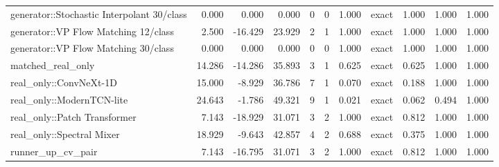 \begin{table}[t]
\begin{tabular}{lrrrrrrrrrr}
generator::Stochastic Interpolant 30/class & 0.000 & 0.000 & 0.000 & 0 & 0 & 1.000 & exact & 1.000 & 1.000 & 1.000 \\
generator::VP Flow Matching 12/class & 2.500 & -16.429 & 23.929 & 2 & 1 & 1.000 & exact & 1.000 & 1.000 & 1.000 \\
generator::VP Flow Matching 30/class & 0.000 & 0.000 & 0.000 & 0 & 0 & 1.000 & exact & 1.000 & 1.000 & 1.000 \\
matched\_real\_only & 14.286 & -14.286 & 35.893 & 3 & 1 & 0.625 & exact & 0.625 & 1.000 & 1.000 \\
real\_only::ConvNeXt-1D & 15.000 & -8.929 & 36.786 & 7 & 1 & 0.070 & exact & 0.188 & 1.000 & 1.000 \\
real\_only::ModernTCN-lite & 24.643 & -1.786 & 49.321 & 9 & 1 & 0.021 & exact & 0.062 & 0.494 & 1.000 \\
real\_only::Patch Transformer & 7.143 & -18.929 & 31.071 & 3 & 2 & 1.000 & exact & 0.812 & 1.000 & 1.000 \\
real\_only::Spectral Mixer & 18.929 & -9.643 & 42.857 & 4 & 2 & 0.688 & exact & 0.375 & 1.000 & 1.000 \\
runner\_up\_cv\_pair & 7.143 & -16.795 & 31.071 & 3 & 2 & 1.000 & exact & 0.812 & 1.000 & 1.000 \\
\bottomrule
\end{tabular}
\end{table}
